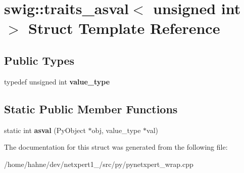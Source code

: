 \hypertarget{structswig_1_1traits__asval_3_01unsigned_01int_01_4}{}\section{swig\+:\+:traits\+\_\+asval$<$ unsigned int $>$ Struct Template Reference}
\label{structswig_1_1traits__asval_3_01unsigned_01int_01_4}
\subsection*{Public Types}
\begin{DoxyCompactItemize}
\item 
typedef unsigned int {\bfseries value\+\_\+type}\hypertarget{structswig_1_1traits__asval_3_01unsigned_01int_01_4_a9dc193a600e548c4230b4efd5e16bb4c}{}\label{structswig_1_1traits__asval_3_01unsigned_01int_01_4_a9dc193a600e548c4230b4efd5e16bb4c}

\end{DoxyCompactItemize}
\subsection*{Static Public Member Functions}
\begin{DoxyCompactItemize}
\item 
static int {\bfseries asval} (Py\+Object $\ast$obj, value\+\_\+type $\ast$val)\hypertarget{structswig_1_1traits__asval_3_01unsigned_01int_01_4_aa08c7b820ef056bf8f92b7982d4b1fab}{}\label{structswig_1_1traits__asval_3_01unsigned_01int_01_4_aa08c7b820ef056bf8f92b7982d4b1fab}

\end{DoxyCompactItemize}


The documentation for this struct was generated from the following file\+:\begin{DoxyCompactItemize}
\item 
/home/hahne/dev/netxpert1\+\_/src/py/pynetxpert\+\_\+wrap.\+cpp\end{DoxyCompactItemize}
